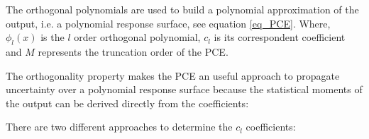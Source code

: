 \documentclass[preprint,12pt]{elsarticle}
\begin{document}




The orthogonal polynomials are used to build a polynomial approximation of the output, i.e. a polynomial response surface, see equation \ref{eq_PCE}. Where, $\phi_{l} (x)$ is the $l$ order orthogonal polynomial, $c_l$ is its correspondent coefficient and $M$ represents the truncation order of the PCE.


The orthogonality property makes the PCE an useful approach to propagate uncertainty over a polynomial response surface because the statistical moments of the output can be derived directly from the coefficients:





There are two different approaches to determine the $c_l$ coefficients:
\end{document}
